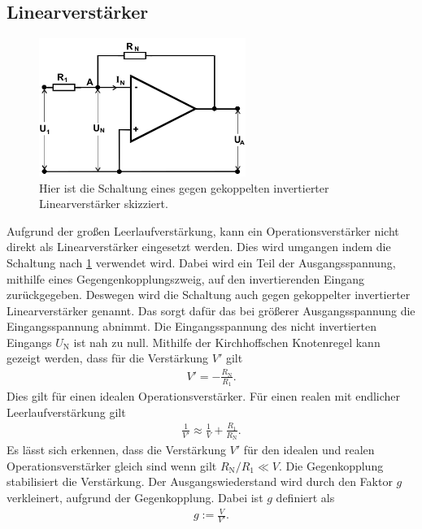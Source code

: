 \subsection{Linearverstärker}
\begin{figure}[h!]
	\centering
	\includegraphics[width = 0.6\textwidth]{../Grafiken/Gegengekoppelter_Invertierter_Liniearverstaerker.png}
	\caption{Hier ist die Schaltung eines gegen gekoppelten invertierter Linearverstärker skizziert. \cite{V51}\label{fig:gegen_gekoppelter_invertierter_Linarverstärker}}
\end{figure}
Aufgrund der großen Leerlaufverstärkung, kann ein Operationsverstärker nicht direkt als Linearverstärker eingesetzt werden.
Dies wird umgangen indem die Schaltung nach \cref{fig:gegen_gekoppelter_invertierter_Linarverstärker} verwendet wird.
Dabei wird ein Teil der Ausgangsspannung, mithilfe eines Gegengenkopplungszweig, auf den invertierenden Eingang zurückgegeben.
Deswegen wird die Schaltung auch gegen gekoppelter invertierter Linearverstärker genannt.
Das sorgt dafür das bei größerer Ausgangsspannung die Eingangsspannung abnimmt.
Die Eingangsspannung des nicht invertierten Eingangs $U_\text{N}$ ist nah zu null.
Mithilfe der Kirchhoffschen Knotenregel kann gezeigt werden, dass für die Verstärkung $V'$ gilt
\begin{align}
	V' = -\frac{R_\text{N}}{R_1}.
\end{align}
Dies gilt für einen idealen Operationsverstärker.
Für einen realen mit endlicher Leerlaufverstärkung gilt 
\begin{align}
	\frac{1}{V'}\approx\frac{1}{V}+\frac{R_1}{R_\text{N}}.
\end{align}
Es lässt sich erkennen, dass die Verstärkung $V'$ für den idealen und realen Operationsverstärker gleich sind wenn gilt $R_\text{N}/R_1\ll V$.
Die Gegenkopplung stabilisiert die Verstärkung.
Der Ausgangswiederstand wird durch den Faktor $g$ verkleinert, aufgrund der Gegenkopplung.
Dabei ist $g$ definiert als
\begin{align}
	g:= \frac{V}{V'}.
\end{align}
